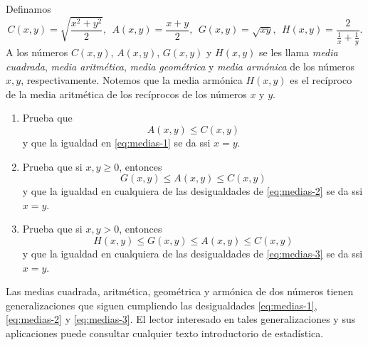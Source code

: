 \documentclass[12pt,a4paper]{book}
\begin{document}
    \begin{ejercicio}\label{ej:61}
        Definamos
        \begin{equation*}
            C(x,y)=\sqrt{\frac{x^{2}+y^{2}}{2}},\ \ A(x,y)=\frac{x+y}{2},\ \ G(x,y)=\sqrt{xy},\ \ H(x,y)=\frac{2}{\frac{1}{x}+\frac{1}{y}}.
        \end{equation*}
        A los números $C(x,y)$, $A(x,y)$, $G(x,y)$ y $H(x,y)$ se les llama \textit{media cuadrada},
        \textit{media aritmética}, \textit{media geométrica} y \textit{media armónica} de los números
        $x,y$, respectivamente. Notemos que la media armónica $H(x,y)$ es el recíproco
        de la media aritmética de los recíprocos de los números $x$ y $y$.
        \begin{enumerate}
            \item Prueba que
            \begin{equation}\label{eq:medias-1}
                A(x,y)\leq C(x,y)
            \end{equation}
            y que la igualdad en \eqref{eq:medias-1} se da ssi $x=y$.
            \item Prueba que si $x,y\geq 0$, entonces
            \begin{equation}\label{eq:medias-2}
                G(x,y)\leq A(x,y)\leq C(x,y)
            \end{equation}
            y que la igualdad en cualquiera de las desigualdades de \eqref{eq:medias-2} se da ssi
            $x=y$.
            \item Prueba que si $x,y>0$, entonces
            \begin{equation}\label{eq:medias-3}
                H(x,y)\leq G(x,y)\leq A(x,y)\leq C(x,y)
            \end{equation}
            y que la igualdad en cualquiera de las desigualdades de \eqref{eq:medias-3} se da ssi
            $x=y$.
        \end{enumerate}
        Las medias cuadrada, aritmética, geométrica y armónica de dos números
        tienen generalizaciones que siguen cumpliendo las desigualdades \eqref{eq:medias-1}, \eqref{eq:medias-2}
        y \eqref{eq:medias-3}. El lector interesado en tales generalizaciones y sus aplicaciones puede
        consultar cualquier texto introductorio de estadística.
    \end{ejercicio}
\end{document}

